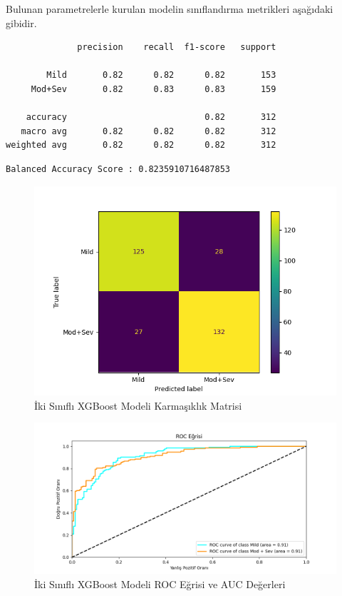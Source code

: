 \documentclass[12pt,twoside]{deuthesis}
\begin{document}
Bulunan parametrelerle kurulan modelin sınıflandırma metrikleri aşağıdaki gibidir.
\begin{verbatim}
              precision    recall  f1-score   support

        Mild       0.82      0.82      0.82       153
     Mod+Sev       0.82      0.83      0.83       159

    accuracy                           0.82       312
   macro avg       0.82      0.82      0.82       312
weighted avg       0.82      0.82      0.82       312
\end{verbatim}
\begin{verbatim}
Balanced Accuracy Score : 0.8235910716487853
\end{verbatim}
\begin{figure}

{\centering \includegraphics[width=1.05\linewidth,height=0.6\textheight]{figure/XGB_bin_conf} 

}

\caption{İki Sınıflı XGBoost Modeli Karmaşıklık Matrisi}\label{fig:unnamed-chunk-73}
\end{figure}
\begin{figure}

{\centering \includegraphics[width=1.05\linewidth,height=0.6\textheight]{figure/XGBClassifier_binary_roc} 

}

\caption{İki Sınıflı XGBoost Modeli ROC Eğrisi ve AUC Değerleri}\label{fig:unnamed-chunk-74}
\end{figure}
\end{document}
